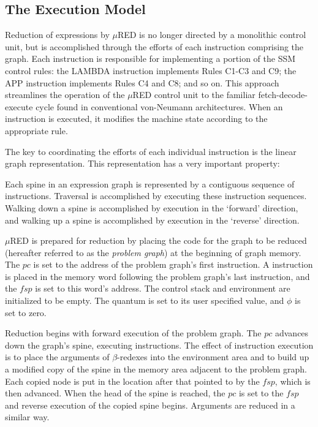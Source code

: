 \subsection{The Execution Model}

Reduction of expressions by \(\mu\)RED is no longer directed by a monolithic control unit, but is accomplished through the efforts of each instruction comprising the graph. Each instruction is responsible for implementing a portion of the SSM control rules: the LAMBDA instruction implements Rules C1-C3 and C9; the APP instruction implements Rules C4 and C8; and so on. This approach streamlines the operation of the \(\mu\)RED control unit to the familiar fetch-decode-execute cycle found in conventional von-Neumann architectures. When an instruction is executed, it modifies the machine state according to the appropriate rule.

The key to coordinating the efforts of each individual instruction is the linear graph representation. This representation has a very important property:

Each spine in an expression graph is represented by a contiguous sequence of instructions. Traversal is accomplished by executing these instruction sequences. Walking down a spine is accomplished by execution in the `forward' direction, and walking up a spine is accomplished by execution in the `reverse' direction.

\(\mu\)RED is prepared for reduction by placing the code for the graph to be reduced (hereafter referred to as the \emph{problem graph}) at the beginning of graph memory. The \(pc\) is set to the address of the problem graph's first instruction. A  instruction is placed in the memory word following the problem graph's last instruction, and the \(fsp\) is set to this word's address. The control stack and environment are initialized to be empty. The quantum is set to its user specified value, and \(\phi\) is set to zero.

Reduction begins with forward execution of the problem graph. The \(pc\) advances down the graph's spine, executing instructions. The effect of instruction execution is to place the arguments of \(\beta\)-redexes into the environment area and to build up a modified copy of the spine in the memory area adjacent to the problem graph. Each copied node is put in the location after that pointed to by the \(fsp\), which is then advanced. When the head of the spine is reached, the \(pc\) is set to the \(fsp\) and reverse execution of the copied spine begins. Arguments are reduced in a similar way.

